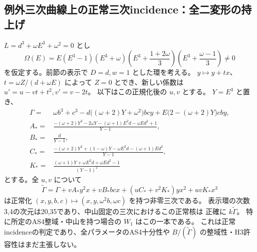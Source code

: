 \subsection{例外三次曲線上の正常三次incidence：全二変形の持上げ}
\label{subsec:cubic-third-root-unit-boundary-L-incidence}
\begin{proposition}[指定 $L$ 開集合の全正常核]
\label{prop:cubic-third-root-unit-boundary-L-incidence}
$L=d^3+\omega E^3+\omega^2=0$ とし
\[
 \Omega(E)=E(E^3-1)(E^3+\omega)
 \left(E^3+\frac{1+2\omega}{3}\right)
 \left(E^3+\frac{\omega-1}{3}\right)\ne0
\]
を仮定する。前節の表示で $D=d,w=1$ とした環を考える。
$y\mapsto y+t x$、$t=\omega Z/(d+\omega E)$ によって
$Z=0$ とでき、新しい係数は $u'=u-vt+t^2,v'=v-2t$。
以下はこの正規化後の $u,v$ とする。
$Y=E^3$ と置き、
\begin{align*}
 \Gamma={}&\omega b^3+c^3-d\bigl((\omega+2)Y+\omega^2\bigr)bcy
       +E\bigl(2-(\omega+2)Y\bigr)cby,\\
 A_*={}&\frac{-(\omega+2)Y^2-2\omega Y-(\omega+1)E^2d-\omega Ed^2+1}{Y-1},\\
 B_*={}&\frac d{Y-1},\\
 C_*={}&\frac{-(\omega+2)Y^2+(1-\omega)Y-\omega E^2d-(\omega+1)Ed^2}{Y-1},\\
 K_*={}&\frac{(\omega+1)Y+\omega E^2d+\omega Ed^2-1}{(Y-1)^2}
\end{align*}
とする。全 $u,v$ について
\[
 \widetilde\Gamma=\Gamma+v A_*y^2x+vB_*bcx
                  +(uC_*+v^2K_*)yx^2+uvK_*x^3
\]
は正常化 $(x,y,b,c)\mapsto(x,y,\omega^2b,\omega c)$ を持つ非零三次である。
表示環の次数3,4の次元は20,35であり、中山固定の三次におけるこの正常核は
正確に $k\widetilde\Gamma$。
特に所定のAS4整域・中山を持つ場合の $W_1$ はこの一本である。
これは正常incidenceの判定であり、全パラメータのAS4十分性や
$B/(\widetilde\Gamma)$ の整域性・H3許容性はまだ主張しない。
\end{proposition}
